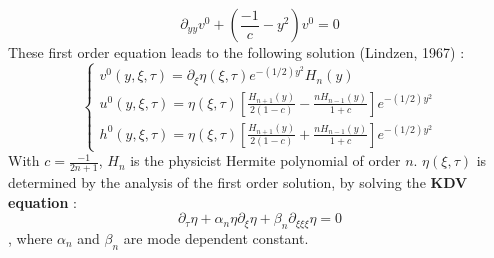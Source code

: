 \documentclass[11pt,a4paper]{report}
\begin{document}
\begin{multicols}{2}
    \begin{equation}
        \label{eq:3}
        \partial_{yy} v^0 + (\frac{-1}{c} - y^2)v^0 = 0
    \end{equation}
    These first order equation leads to the following solution (Lindzen, 1967) :
    \begin{equation}
        \label{eq:Rossby}
        \begin{cases}
            v^0(y, \xi, \tau) = \partial_\xi \eta(\xi, \tau) e^{-(1/2)y^2}H_n(y)                                     \\
            u^0(y, \xi, \tau) = \eta(\xi, \tau) [ \frac{H_{n+1}(y)}{2(1-c)} - \frac{nH_{n-1}(y)}{1 +c}]e^{-(1/2)y^2} \\
            h^0(y, \xi, \tau) = \eta(\xi, \tau) [ \frac{H_{n+1}(y)}{2(1-c)} + \frac{nH_{n-1}(y)}{1 +c }]e^{-(1/2)y^2}
        \end{cases}
    \end{equation}
    With $c = \frac{-1}{2n + 1}$, $H_n$ is the physicist Hermite polynomial of order $n$. $\eta(\xi,\tau)$ is determined by the analysis of the first order solution, by solving the \textbf{KDV equation} :
    \begin{equation}
        \label{eq:5}
        \partial_\tau \eta + \alpha_n \eta \partial_\xi \eta +\beta_n \partial_{\xi \xi \xi} \eta = 0
    \end{equation}
    \cite{Boyd80}, where $\alpha_n$ and $\beta_n$ are mode dependent constant.


\end{multicols}
\end{document}
